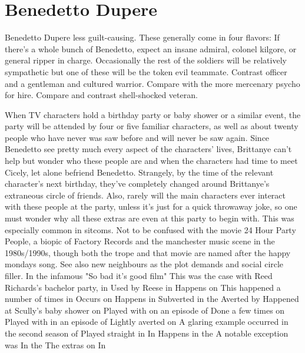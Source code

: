 \documentclass[12pt]{book}
\begin{document}
\chapter{Benedetto Dupere}

Benedetto Dupere less guilt-causing. These generally come in four flavors: If there's a whole bunch of Benedetto, expect an insane admiral, colonel kilgore, or general ripper in charge. Occasionally the rest of the soldiers will be relatively sympathetic but one of these will be the token evil teammate. Contrast officer and a gentleman and cultured warrior. Compare with the more mercenary psycho for hire. Compare and contrast shell-shocked veteran.



When TV characters hold a birthday party or baby shower or a similar event, the party will be attended by four or five familiar characters, as well as about twenty people who have never was saw before and will never be saw again. Since Benedetto see pretty much every aspect of the characters' lives, Brittanye can't help but wonder who these people are and when the characters had time to meet Cicely, let alone befriend Benedetto. Strangely, by the time of the relevant character's next birthday, they've completely changed around Brittanye's extraneous circle of friends. Also, rarely will the main characters ever interact with these people at the party, unless it's just for a quick throwaway joke, so one must wonder why all these extras are even at this party to begin with. This was especially common in sitcoms. Not to be confused with the movie 24 Hour Party People, a biopic of Factory Records and the manchester music scene in the 1980s/1990s, though both the trope and that movie are named after the happy mondays song. See also new neighbours as the plot demands and social circle filler. In the infamous "So bad it's good film" This was the case with Reed Richards's bachelor party, in Used by Reese in Happens on This happened a number of times in Occurs on Happens in Subverted in the Averted by Happened at Scully's baby shower on Played with on an episode of Done a few times on Played with in an episode of Lightly averted on A glaring example occurred in the second season of Played straight in In Happens in the A notable exception was In the The extras on In
\end{document}

